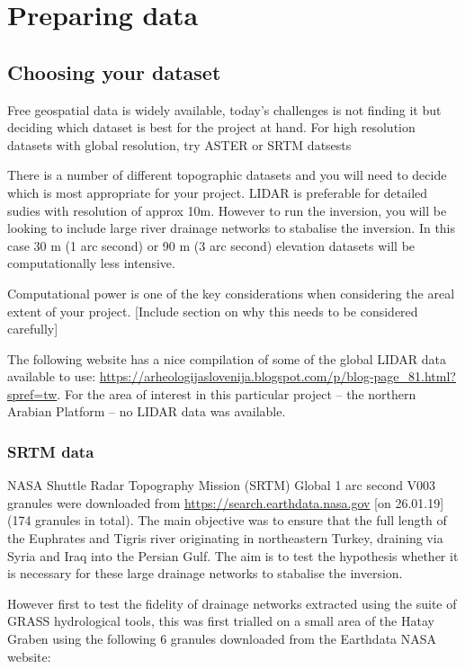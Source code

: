 \chapter{Preparing data} \label{prep}

\section{Choosing your dataset}

Free geospatial data is widely available, today's challenges is not finding it but deciding which dataset is best for the project at hand. For high resolution datasets with global resolution, try ASTER or SRTM datsests

There is a number of different topographic datasets and you will need to decide which is most appropriate for your project. LIDAR is preferable for detailed sudies with resolution of approx 10m. However to run the inversion, you will be looking to include large river drainage networks to stabalise the inversion. In this case 30 m (1 arc second) or 90 m (3 arc second) elevation datasets will be computationally less intensive. 

Computational power is one of the key considerations when considering the areal extent of your project. [Include section on why this needs to be considered carefully]

The following website has a nice compilation of some of the global LIDAR data available to use: \url{https://arheologijaslovenija.blogspot.com/p/blog-page_81.html?spref=tw}. For the area of interest in this particular project – the northern Arabian Platform – no LIDAR data was available. 

\subsection{SRTM data}

NASA Shuttle Radar Topography Mission (SRTM) Global 1 arc second V003 granules were downloaded from \url{https://search.earthdata.nasa.gov} [on 26.01.19] (174 granules in total). The main objective was to ensure that the full length of the Euphrates and Tigris river originating in northeastern Turkey, draining via Syria and Iraq into the Persian Gulf. The aim is to test the hypothesis whether it is necessary for these large drainage networks to stabalise the inversion. 

However first to test the fidelity of drainage networks extracted using the suite of GRASS hydrological tools, this was first trialled on a small area of the Hatay Graben using the following 6 granules downloaded from the Earthdata NASA website:

